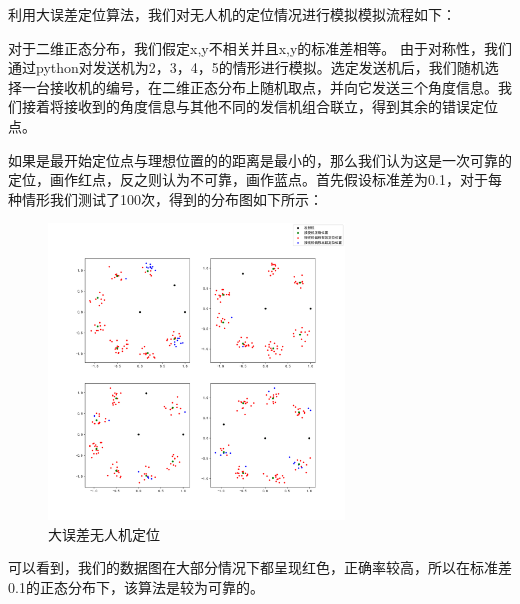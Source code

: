 \documentclass{my_paper}
\begin{document}
利用大误差定位算法，我们对无人机的定位情况进行模拟模拟流程如下：

对于二维正态分布，我们假定x,y不相关并且x,y的标准差相等。
由于对称性，我们通过python对发送机为2，3，4，5的情形进行模拟。选定发送机后，我们随机选择一台接收机的编号，在二维正态分布上随机取点，并向它发送三个角度信息。我们接着将接收到的角度信息与其他不同的发信机组合联立，得到其余的错误定位点。

如果是最开始定位点与理想位置的的距离是最小的，那么我们认为这是一次可靠的定位，画作红点，反之则认为不可靠，画作蓝点。首先假设标准差为0.1，对于每种情形我们测试了100次，得到的分布图如下所示：

\begin{figure}[H]
    \centering
    \includegraphics[width=0.7\textwidth]{two0}
    \caption{大误差无人机定位} 
\end{figure}

可以看到，我们的数据图在大部分情况下都呈现红色，正确率较高，所以在标准差0.1的正态分布下，该算法是较为可靠的。
\end{document}
